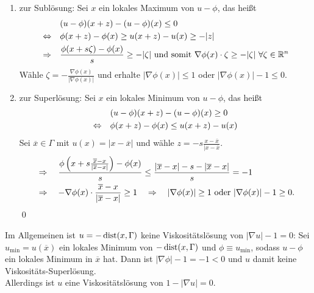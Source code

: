 	\begin{enumerate}
		\item zur Sublösung: Sei $x$ ein lokales Maximum von $u - \phi$, das heißt
		\begin{equation}
		\begin{aligned}
			&(u-\phi)(x+z)-(u-\phi)(x) \leq 0 \\ \notag
			\Leftrightarrow \quad &\phi(x+z) - \phi(x) \geq u(x+z) - u(x) \geq -|z| \\
			\Rightarrow \quad &\frac{\phi(x+s\zeta) - \phi(x)}{s} \geq -|\zeta| \text{ und somit } \nabla\phi(x) \cdot \zeta \geq -|\zeta| \ \forall \zeta \in \mathbb{R}^n 
		\end{aligned}
		\end{equation}
		Wähle $\zeta = - \frac{\nabla \phi(x)}{|\nabla \phi(x)|}$ und erhalte $|\nabla \phi(x)| \leq 1$ oder $|\nabla \phi(x)| - 1 \leq 0$.
		\item zur Superlösung:  Sei $x$ ein lokales Minimum von $u - \phi$, das heißt
		\begin{equation}
		\begin{aligned}
			&(u-\phi)(x+z)-(u-\phi)(x) \geq 0 \\ \notag
			\Leftrightarrow \quad &\phi(x+z) - \phi(x) \leq u(x+z) - u(x) \\
		\end{aligned}
		\end{equation}
		Sei $\overline{x} \in \Gamma$ mit $u(x) = |x-\overline{x}|$ und wähle $z = -s \frac{x-\overline{x}}{|x-\overline{x}}$.
		\begin{equation}
		\begin{aligned}
			&\Rightarrow \quad \frac{ \phi \left(x+s\frac{\overline{x}-x}{|\overline{x}-x|} \right) - \phi(x)}{s} \leq \frac{|\overline{x} - x| - s - |\overline{x}-x|}{s} = -1 \\ \notag
			&\Rightarrow \quad -\nabla \phi(x) \cdot \frac{\overline{x}-x}{|\overline{x}-x|} \geq 1
			\quad \Rightarrow \quad |\nabla\phi(x)| \geq 1 \text{ oder } |\nabla \phi(x)|-1 \geq 0. 
		\end{aligned}
		\end{equation}
		\qed
	\end{enumerate}
	
\begin{bem} \label{bem_24}
	Im Allgemeinen ist $u  = -\operatorname{dist}(x,\Gamma)$ \marginnote{[24]} keine Viskositätslösung von $|\nabla u|-1 = 0$: Sei $u_{\min} = u(\overline{x})$ ein lokales Minimum von $-\operatorname{dist}(x,\Gamma)$ und $\phi \equiv u_{\min}$, sodass $u  -\phi$ ein lokales Minimum in $\overline{x}$ hat. Dann ist $|\nabla \phi| - 1 = -1 < 0$ und $u$ damit keine Viskositäts-Superlösung. \\
	Allerdings ist $u$ eine Viskositätslösung von $1-|\nabla u| = 0$.
\end{bem}
	
